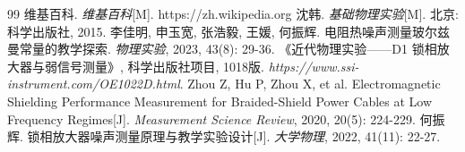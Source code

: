 
%
%
%
%
%
%
%


\renewcommand{\refname}{Reference}
\begin{thebibliography}{99}	
	 维基百科. \emph{维基百科}[M]. https://zh.wikipedia.org
	 沈韩. \emph{基础物理实验}[M]. 北京: 科学出版社, 2015.	
	 李佳明, 申玉宽, 张浩毅, 王媛, 何振辉. 电阻热噪声测量玻尔兹曼常量的教学探索. \emph{物理实验}, 2023, 43(8): 29-36.
	《近代物理实验——D1 锁相放大器与弱信号测量》, 科学出版社项目, 1018版.
	 \emph{https://www.ssi-instrument.com/OE1022D.html}.
	 Zhou Z, Hu P, Zhou X, et al. Electromagnetic Shielding Performance Measurement for Braided-Shield Power Cables at Low Frequency Regimes[J]. \emph{Measurement Science Review}, 2020, 20(5): 224-229.
	 何振辉. 锁相放大器噪声测量原理与教学实验设计[J]. \emph{大学物理}, 2022, 41(11): 22-27.
	
\end{thebibliography}